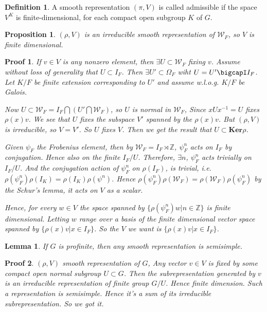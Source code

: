 \documentclass[12pt,a4paper,english]{article}
\theoremstyle{definition}
\newtheorem{defi}{Definition}[section]
\theoremstyle{plain}
\newtheorem*{lem}{Lemma}
\newtheorem{prop}{Proposition}
\newtheorem{pf}{Proof}
\begin{document}
\begin{defi}
A smooth representation $(\pi,V)$ is called admissible if the space $V^{K}$ is finite-dimensional, for each compact open subgroup $K$ of $G$.
\end{defi}
\begin{prop}
$(\rho,V)$ is an irreducible smooth representation of $\mathcal{W}_{F}$, so $V$ is finite dimensional.
\end{prop}
\begin{pf}
If $v\in V$ is any nonzero element, then $\exists U\subset \mathcal{W}_{F}$ fixing $v$. Assume without loss of generality that $U\subset I_{F}$. Then $\exists U'\subset \Omega_{F}$ wiht $U=U'\bigcapI I_{F}$. Let $K/F$ be finite extension corresponding to $U'$ and assume w.l.o.g. $K/F$ be Galois. 

Now $U\subset \mathcal{W}_{F}=I_{F}\bigcap (U'\bigcap \mathcal{W}_{F})$, so $U$ is normal in $\mathcal{W}_{F}$, Since $xUx^{-1}=U$ fixes $\rho(x)v$. We see that $U$ fixes the subspace $V'$ spanned by the $\rho(x)v$. But $(\rho, V)$ is irreducible, so $V=V'$. So $U$ fixes $V$. Then we get the result that $U\subset \textbf{Ker}\rho$.

Given $\psi_{F}$ the Frobenius element, then by  $\mathcal{W}_{F}=I_{F}\rtimes \mathbb{Z}$, $\psi_{F}^{n}$ acts on $I_{F}$ by conjugation. Hence also on the finite $I_{F}/U$. Therefore, $\exists n$, $\psi_{F}^{n}$ acts trivially on $I_{F}/U$. And the conjugation action of $\psi^{n}_{F}$ on $\rho(I_{F})$, is trivial, i.e. $\rho(\psi^{n}_{F})\rho(I_{K})=\rho(I_{K})\rho(\psi^{n})$. Hence $\rho(\psi^{n}_{F})\rho(\mathcal{W}_{F})=\rho(\mathcal{W}_{F})\rho(\psi^{n}_{F})$ by the Schur's lemma, it acts on $V$ as a scalar.

Hence, for every $w\in V$ the space spanned by $\{\rho(\psi^{n}_{F})w|n\in\mathbb{Z}\}$ is finite dimensional. Letting $w$ range over a basis of the finite dimensional vector space spanned by $\{\rho(x)v|x\in I_{F}\}$. So the $V$ we want is $\{\rho(x)v|x\in I_{F}\}$.

\end{pf}
\begin{lem}
If $G$ is profinite, then any smooth representation is semisimple.

\end{lem}
\begin{pf}
$(\rho, V)$ smooth representation of $G$, Any vector $v\in V$ is fixed by some compact open normal subgroup $U\subset G$. Then the subrepresentation generated by $v$ is an irreducible representation of finite group $G/U$. Hence finite dimension. Such a representation is semisimple. Hence it's a sum of its irreducible subrepresentation. So we got it. 
\end{pf}
\end{document}
